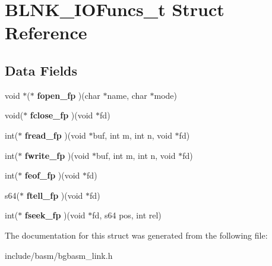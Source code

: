 \hypertarget{structBLNK__IOFuncs__t}{\section{B\-L\-N\-K\-\_\-\-I\-O\-Funcs\-\_\-t Struct Reference}
\label{structBLNK__IOFuncs__t}
}
\subsection*{Data Fields}
\begin{DoxyCompactItemize}
\item 
\hypertarget{structBLNK__IOFuncs__t_ad64f90fd56a45ebca43d0e46c5282f0e}{void $\ast$($\ast$ {\bfseries fopen\-\_\-fp} )(char $\ast$name, char $\ast$mode)}\label{structBLNK__IOFuncs__t_ad64f90fd56a45ebca43d0e46c5282f0e}

\item 
\hypertarget{structBLNK__IOFuncs__t_a42c83779866ab73ee50e64358fb047bb}{void($\ast$ {\bfseries fclose\-\_\-fp} )(void $\ast$fd)}\label{structBLNK__IOFuncs__t_a42c83779866ab73ee50e64358fb047bb}

\item 
\hypertarget{structBLNK__IOFuncs__t_a23dc6c6029ca202486f6eac29c024871}{int($\ast$ {\bfseries fread\-\_\-fp} )(void $\ast$buf, int m, int n, void $\ast$fd)}\label{structBLNK__IOFuncs__t_a23dc6c6029ca202486f6eac29c024871}

\item 
\hypertarget{structBLNK__IOFuncs__t_a390e43e0cd728900cc12bed4a1051595}{int($\ast$ {\bfseries fwrite\-\_\-fp} )(void $\ast$buf, int m, int n, void $\ast$fd)}\label{structBLNK__IOFuncs__t_a390e43e0cd728900cc12bed4a1051595}

\item 
\hypertarget{structBLNK__IOFuncs__t_a3ee31ea87222f85cd89bd712668846b8}{int($\ast$ {\bfseries feof\-\_\-fp} )(void $\ast$fd)}\label{structBLNK__IOFuncs__t_a3ee31ea87222f85cd89bd712668846b8}

\item 
\hypertarget{structBLNK__IOFuncs__t_a4893de49938fb9a291324ab6d63407c7}{s64($\ast$ {\bfseries ftell\-\_\-fp} )(void $\ast$fd)}\label{structBLNK__IOFuncs__t_a4893de49938fb9a291324ab6d63407c7}

\item 
\hypertarget{structBLNK__IOFuncs__t_a1fc9f9396261724e55ab5f06733d8690}{int($\ast$ {\bfseries fseek\-\_\-fp} )(void $\ast$fd, s64 pos, int rel)}\label{structBLNK__IOFuncs__t_a1fc9f9396261724e55ab5f06733d8690}

\end{DoxyCompactItemize}


The documentation for this struct was generated from the following file\-:\begin{DoxyCompactItemize}
\item 
include/basm/bgbasm\-\_\-link.\-h\end{DoxyCompactItemize}
